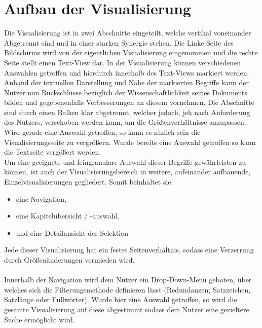 \section{Aufbau der Visualisierung}
Die Visualisierung ist in zwei Abschnitte eingeteilt, welche vertikal voneinander Abgetrennt sind und in einer starken Synergie stehen. Die Linke Seite des Bildschirms wird von der eigentlichen Visualisierung eingenommen und die rechte Seite stellt einen Text-View dar. In der Visualisierung k\"onnen verschiedenen Auswahlen getroffen und hierdurch innerhalb des Text-Views markiert werden. Anhand der textuellen Darstellung und N\"ahe der markierten Begriffe kann der Nutzer nun R\"uckschl\"usse bez\"uglich der Wissenschaftlichkeit seines Dokuments bilden und gegebenenfalls Verbesserungen an diesem vornehmen. Die Abschnitte sind durch einen Balken klar abgetrennt, welcher jedoch, jeh nach Anforderung des Nutzers, verschoben werden kann, um die Gr\"o{\ss}enverh\"altnisse anzupassen. Wird gerade eine Auswahl getroffen, so kann es n\"tzlich sein die Visualisierungsseite zu vergr\"o{\ss}ern. Wurde bereits eine Auswahl getroffen so kann die Textseite verg\"o{\ss}ert werden.\\
Um eine geeignete und feingranulare Auswahl dieser Begriffe gew\"ahrleisten zu k\"onnen, ist auch der Visualisierungsbereich in weitere, aufeinander aufbauende, Einzelvisualisierungen gegliedert. Somit beinhaltet sie:
\begin{center} 
   \begin{varwidth}{2in} 
      \begin{itemize} 
         \item eine Navigation,
		 \item eine Kapitel\"ubersicht / -auswahl,
		 \item und eine Detailansicht der Selektion 
      \end{itemize} 
   \end{varwidth} 
\end{center} 
Jede dieser Visualisierung hat ein festes Seitenverh\"altnis, sodass eine Verzerrung durch Gr\"o{\ss}en\"anderungen vermieden wird.\\
\\
Innerhalb der Navigation wird dem Nutzer ein Drop-Down-Men\"u geboten, \"uber welches sich die Filterungsmethode definieren l\"asst (Redundanzen, Satzzeichen, Satzl\"ange oder F\"ullw\"orter). Wurde hier eine Auswahl getroffen, so wird die gesamte Visualisierung auf diese abgestimmt sodass dem Nutzer eine gezieltere Suche erm\"oglicht wird.\\
